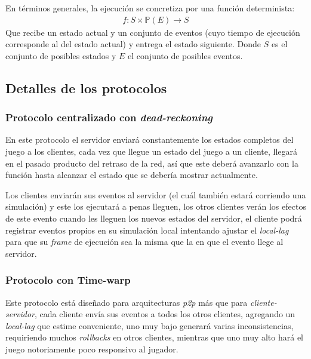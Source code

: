 En términos generales, la ejecución se concretiza por una función determinista:
\begin{align*}
    f : S \times \mathbb{P}(E) \rightarrow S
\end{align*}
Que recibe un estado actual y un conjunto de eventos (cuyo tiempo de ejecución corresponde al del estado actual) y entrega el estado siguiente. Donde $S$ es el conjunto de posibles estados y $E$ el conjunto de posibles eventos.


\subsection{Detalles de los protocolos}


\subsubsection{Protocolo centralizado con \emph{dead-reckoning}}

En este protocolo el servidor enviará constantemente los estados completos del juego a los clientes, cada vez que llegue un estado del juego a un cliente, llegará en el pasado producto del retraso de la red, así que este deberá avanzarlo con la función hasta alcanzar el estado que se debería mostrar actualmente.

Los clientes enviarán sus eventos al servidor (el cuál también estará corriendo una simulación) y este los ejecutará a penas lleguen, los otros clientes verán los efectos de este evento cuando les lleguen los nuevos estados del servidor, %
el cliente podrá registrar eventos propios en su simulación local intentando ajustar el \emph{local-lag} para que su \emph{frame} de ejecución sea la misma que la en que el evento llege al servidor.

\subsubsection{Protocolo con Time-warp}

Este protocolo está diseñado para arquitecturas \emph{p2p} más que para \emph{cliente-servidor}, cada cliente envía sus eventos a todos los otros clientes, agregando un \emph{local-lag} que estime conveniente, uno muy bajo generará varias inconsistencias, requiriendo muchos \emph{rollbacks} en otros clientes, mientras que uno muy alto hará el juego notoriamente poco responsivo al jugador.

